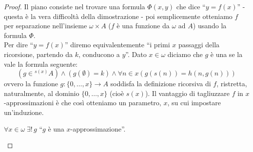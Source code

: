 \documentclass[11pt]{scrartcl}
\begin{document}
\begin{proof}
	Il piano consiste nel trovare una formula $\Phi(x,y)$ che dice ``$y = f(x)$'' - questa è la vera difficoltà 
	della dimostrazione - poi semplicemente otteniamo $f$ per separazione nell'insieme $\omega \times A$ ($f$ è una funzione da $\omega$ ad $A$) usando la formula $\Phi$.\\
	Per dire ``$y = f(x)$'' diremo equivalentemente ``i primi $x$ passaggi della ricorsione, partendo da $k$, conducono a $y$''.
	Dato $x \in \omega$ diciamo che $g$ è una  se la vale la formula seguente:
	\[ (g \in {}^{s(x)}A ) \land (g(\emptyset) = k) \land \forall n \in x (g(s(n)) = h(n,g(n)))
		\]
	ovvero la funzione $g : \{0,\ldots,x\} \rightarrow A$ soddisfa la definizione ricorsiva di $f$, ristretta, naturalmente, al dominio $\{0,\ldots,x\}$ (cioè $s(x)$).
	Il vantaggio di tagliuzzare $f$ in $x$-approssimazioni è che così otteniamo un parametro, $x$, su cui impostare un'induzione.
	
	\begin{lemma}
		$\forall x \in \omega \; \exists ! \, g$ ``$g$ è una $x$-approssimazione''.
	\end{lemma}


\end{proof}
\end{document}
